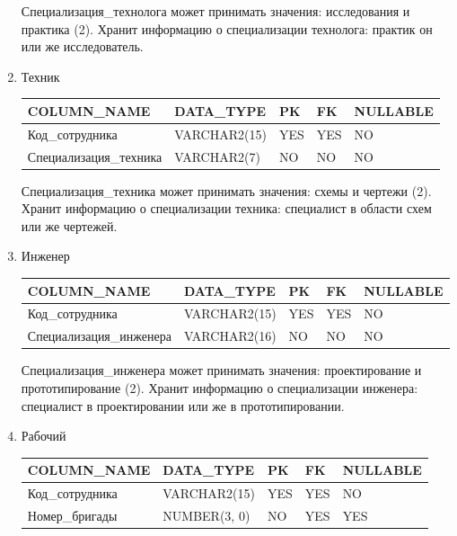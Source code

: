\begin{enumerate}
\begin{tabular}{|p{7cm}|p{3cm}|p{1cm}|p{1cm}|p{3cm}|}
    \end{tabular}

    Специализация\_технолога может принимать значения: исследования и практика (2).
    Хранит информацию о специализации технолога: практик он или же исследователь.

    \item{Техник}

    \begin{tabular}{|p{7cm}|p{3cm}|p{1cm}|p{1cm}|p{3cm}|} \hline

        {\bf COLUMN\_NAME} & {\bf DATA\_TYPE} & {\bf PK} & {\bf FK} & {\bf NULLABLE} \\ \hline
        Код\_сотрудника & VARCHAR2(15) & YES & YES & NO \\ \hline
        Специализация\_техника & VARCHAR2(7) & NO & NO & NO \\ \hline

    \end{tabular}

    Специализация\_техника может принимать значения: схемы и чертежи (2).
    Хранит информацию о специализации техника: специалист в области схем или же чертежей.

    \item{Инженер}

    \begin{tabular}{|p{7cm}|p{3cm}|p{1cm}|p{1cm}|p{3cm}|} \hline

        {\bf COLUMN\_NAME} & {\bf DATA\_TYPE} & {\bf PK} & {\bf FK} & {\bf NULLABLE} \\ \hline
        Код\_сотрудника & VARCHAR2(15) & YES & YES & NO \\ \hline
        Специализация\_инженера & VARCHAR2(16) & NO & NO & NO \\ \hline

    \end{tabular}

    Специализация\_инженера может принимать значения: проектирование и прототипирование (2).
    Хранит информацию о специализации инженера: специалист в проектировании или же в прототипировании.

    \item{Рабочий}

    \begin{tabular}{|p{7cm}|p{3cm}|p{1cm}|p{1cm}|p{3cm}|} \hline

        {\bf COLUMN\_NAME} & {\bf DATA\_TYPE} & {\bf PK} & {\bf FK} & {\bf NULLABLE} \\ \hline
        Код\_сотрудника & VARCHAR2(15) & YES & YES & NO \\ \hline
        Номер\_бригады & NUMBER(3, 0) & NO & YES & YES \\ \hline


\end{tabular}
\end{enumerate}
